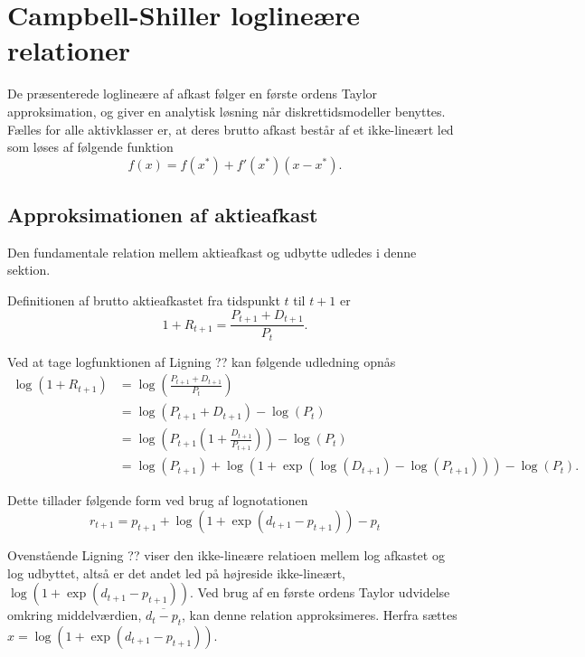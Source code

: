 \documentclass[
  a4paper,
  oneside]{memoir}
\begin{document}
\hypertarget{campbell-shiller-loglineuxe6re-relationer}{%
\chapter{Campbell-Shiller loglineære relationer}\label{campbell-shiller-loglineuxe6re-relationer}}

De præsenterede loglineære af afkast følger en første ordens Taylor approksimation, og giver en analytisk løsning når diskrettidsmodeller benyttes. Fælles for alle aktivklasser er, at deres brutto afkast består af et ikke-lineært led som løses af følgende funktion
\[f(x)=f(x^*)+f'(x^*)(x-x^*).\]

\hypertarget{approksimationen-af-aktieafkast}{%
\section{Approksimationen af aktieafkast}\label{approksimationen-af-aktieafkast}}

Den fundamentale relation mellem aktieafkast og udbytte udledes i denne sektion.

Definitionen af brutto aktieafkastet fra tidspunkt \(t\) til \(t+1\) er
\begin{equation}
1+R_{t+1}=\frac{P_{t+1}+D_{t+1}}{P_t}.
\end{equation}

Ved at tage logfunktionen af Ligning ?? kan følgende udledning opnås
\begin{align}
\log\left(1+R_{t+1}\right)&=\log\left(\frac{P_{t+1}+D_{t+1}}{P_t}\right)\\
&=\log\left(P_{t+1}+D_{t+1}\right)-\log\left(P_t\right)\\
&=\log\left(P_{t+1}\left(1+\frac{D_{t+1}}{P_{t+1}}\right)\right)-\log\left(P_t\right)\\
&=\log\left(P_{t+1}\right)+\log\left(1+\exp\left(\log\left(D_{t+1}\right)-\log\left(P_{t+1}\right)\right)\right)-\log\left(P_t\right).
\end{align}

Dette tillader følgende form ved brug af lognotationen
\[r_{t+1}=p_{t+1} +\log\left(1+\exp(d_{t+1}-p_{t+1})\right)-p_t\]

Ovenstående Ligning ?? viser den ikke-lineære relatioen mellem log afkastet og log udbyttet, altså er det andet led på højreside ikke-lineært, \(\log\left(1+\exp(d_{t+1}-p_{t+1})\right)\). Ved brug af en første ordens Taylor udvidelse omkring middelværdien, \(\overline{d_t-p_t}\), kan denne relation approksimeres. Herfra sættes \(x=\log\left(1+\exp(d_{t+1}-p_{t+1})\right)\).
\end{document}
